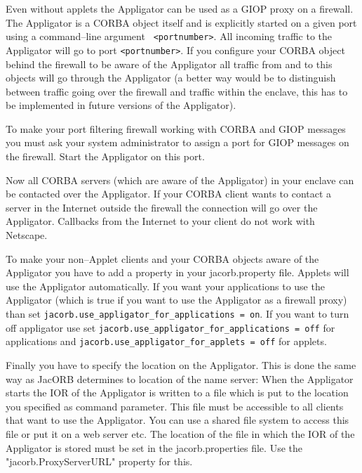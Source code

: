 \documentclass[12pt]{scrbook}
\begin{document}
Even without applets  the Appligator can be used as a  GIOP proxy on a
firewall. The  Appligator is a  CORBA object itself and  is explicitly
started  on   a  given  port  using  a   command--line  argument  {\tt
<portnumber>}.  All incoming traffic to the Appligator will go to port
{\tt  <portnumber>}.  If you  configure your  CORBA object  behind the
firewall to  be aware of the  Appligator all traffic from  and to this
objects  will go  through the  Appligator (a  better way  would  be to
distinguish between traffic going over the firewall and traffic within
the  enclave, this has  to be  implemented in  future versions  of the
Appligator).

To  make your  port filtering  firewall  working with  CORBA and  GIOP
messages you must  ask your system administrator to  assign a port for
GIOP messages on the firewall. Start the Appligator on this port.

Now  all CORBA servers  (which are  aware of  the Appligator)  in your
enclave can  be contacted over  the Appligator.  If your  CORBA client
wants to  contact a  server in the  Internet outside the  firewall the
connection will go over the Appligator. Callbacks from the Internet to
your client do not work with Netscape.

To make your  non--Applet clients and your CORBA  objects aware of the
Appligator you  have to add  a property in your  jacorb.property file.
Applets  will  use the  Appligator  automatically.  If  you want  your
applications to use  the Appligator (which is true if  you want to use
the     Appligator     as    a     firewall     proxy)    than     set
{\tt jacorb.use\_appligator\_for\_applications  = on}.  If  you want  to turn
off appligator use  set {\tt jacorb.use\_appligator\_for\_applications = off}
for  applications and  {\tt jacorb.use\_appligator\_for\_applets  = off}  for
applets.

Finally you  have to specify the  location on the  Appligator. This is
done the same way as  JacORB determines to location of the name server:
When the Appligator  starts the IOR of the Appligator  is written to a
file which is put to  the location you specified as command parameter.
This  file must  be accessible  to all  clients that  want to  use the
Appligator.  You  can use a shared  file system to access  this file or
put it on a web server etc.  The location of the file in which the IOR
of  the Appligator  is stored  must  be set  in the  jacorb.properties
file. Use the "jacorb.ProxyServerURL" property for this.
\end{document}
